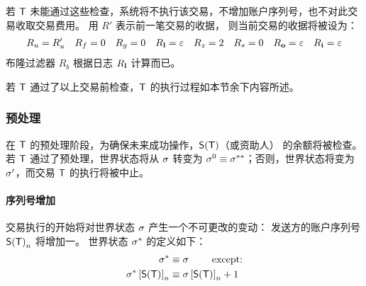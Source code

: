 若 $\textsf{T}$ 未能通过这些检查，系统将不执行该交易，不增加账户序列号，也不对此交易收取交易费用。
用 $R'$ 表示前一笔交易的收据，
则当前交易的收据将被设为：
\begin{align}
	R_u=R'_u && R_f=0 && R_g=0 && R_{\bf l}=\mathbb{\varepsilon} && R_z=2 && R_s=0 && R_{\bf o}=\mathbb{\varepsilon} && R_{\bf i}=\mathbb{\varepsilon}
\end{align}
%
布隆过滤器 $R_b$ 根据日志 $R_{\bf l}$ 计算而已。

若 $\textsf{T}$ 通过了以上交易前检查，$\textsf{T}$ 的执行过程如本节余下内容所述。


\subsubsection{预处理}
\label{subsubsec:preprocessing}

在 $\textsf{T}$ 的预处理阶段，为确保未来成功操作，$\mathsf{S}{\left({\textsf{T}} \right)}$（或资助人） 的余额将被检查。
若 $\textsf{T}$ 通过了预处理，世界状态将从 $\mathbf{\sigma}$ 转变为 $\mathbf{\sigma}^0\equiv \mathbf{\sigma}^{**}$；否则，世界状态将变为 $\mathbf{\sigma}'$，而交易 $\textsf{T}$ 的执行将被中止。

\paragraph{序列号增加}
交易执行的开始将对世界状态 $\mathbf{\sigma}$ 产生一个不可更改的变动：
发送方的账户序列号 $\mathsf{S}{\left({\textsf{T}} \right)}_n$ 将增加一。
%
世界状态 $\mathbf{\sigma}^*$ 的定义如下：
\begin{align}
	\mathbf{\sigma}^*  &\equiv \mathbf{\sigma} \qquad \mbox{  except:}\\
	\mathbf{\sigma}^*\left[\mathsf{S}{\left({\textsf{T}} \right)} \right]_n &\equiv \mathbf{\sigma}\left[\mathsf{S}{\left({\textsf{T}} \right)} \right]_n+1 
\end{align}

